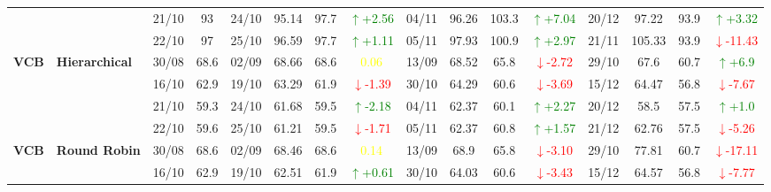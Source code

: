 \documentclass{ieeeaccess}
\begin{document}
\begin{table}[!h]
\begin{tabular}{llcc|cccc|cccc|cccc}
&
& 21/10 & 93 & 24/10 & 95.14 & 97.7 & \textcolor{green}{\(\uparrow\)+2.56} & 04/11 & 96.26 & 103.3 & \textcolor{green}{\(\uparrow\)+7.04} & 20/12 & 97.22 & 93.9 & \textcolor{green}{\(\uparrow\)+3.32} \\

&
& 22/10 & 97 & 25/10 & 96.59 & 97.7 & \textcolor{green}{\(\uparrow\)+1.11} & 05/11 & 97.93 & 100.9 & \textcolor{green}{\(\uparrow\)+2.97} & 21/11 & 105.33 & 93.9 & \textcolor{red}{\(\downarrow\)-11.43} \\
\midrule




\multirow{4}{*}{\textbf{VCB}} 
& \textbf{Hierarchical}
& 30/08 & 68.6 & 02/09 & 68.66 & 68.6 & \textcolor{yellow}{0.06} & 13/09 & 68.52 & 65.8 & \textcolor{red}{\(\downarrow\)-2.72} & 29/10 & 67.6 & 60.7 & \textcolor{green}{\(\uparrow\)+6.9} \\

&
& 16/10 & 62.9 & 19/10 & 63.29 & 61.9 & \textcolor{red}{\(\downarrow\)-1.39} & 30/10 & 64.29 & 60.6 & \textcolor{red}{\(\downarrow\)-3.69} & 15/12 & 64.47 & 56.8 & \textcolor{red}{\(\downarrow\)-7.67} \\

&
& 21/10 & 59.3 & 24/10 & 61.68 & 59.5 & \textcolor{green}{\(\uparrow\)-2.18} & 04/11 & 62.37 & 60.1 & \textcolor{green}{\(\uparrow\)+2.27} & 20/12 & 58.5 & 57.5 & \textcolor{green}{\(\uparrow\)+1.0} \\

&
& 22/10 & 59.6 & 25/10 & 61.21 & 59.5 & \textcolor{red}{\(\downarrow\)-1.71} & 05/11 & 62.37 & 60.8 & \textcolor{green}{\(\uparrow\)+1.57} & 21/12 & 62.76 & 57.5 & \textcolor{red}{\(\downarrow\)-5.26} \\
\midrule


\multirow{4}{*}{\textbf{VCB}} 
& \textbf{Round Robin}
& 30/08 & 68.6 & 02/09 & 68.46 & 68.6 & \textcolor{yellow}{0.14} & 13/09 & 68.9 & 65.8 & \textcolor{red}{\(\downarrow\)-3.10} & 29/10 & 77.81 & 60.7 & \textcolor{red}{\(\downarrow\)-17.11} \\

&
& 16/10 & 62.9 & 19/10 & 62.51 & 61.9 & \textcolor{green}{\(\uparrow\)+0.61} & 30/10 & 64.03 & 60.6 & \textcolor{red}{\(\downarrow\)-3.43} & 15/12 & 64.57 & 56.8 & \textcolor{red}{\(\downarrow\)-7.77} \\


\end{tabular}
\end{table}
\end{document}
